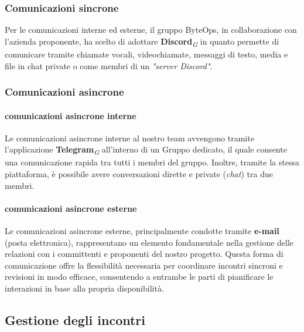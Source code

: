 \documentclass{article}
\begin{document}
    \subsubsection{Comunicazioni sincrone}
    Per le comunicazioni interne ed esterne, il gruppo ByteOps, in collaborazione con l'azienda proponente, ha scelto di adottare \textbf{Discord}\textsubscript{\textit{G}} in quanto permette di comunicare tramite chiamate vocali, videochiamate, messaggi di testo, media e file in chat private o come membri di un \textit{"server Discord"}.
    \subsubsection{Comunicazioni asincrone}
        \paragraph{comunicazioni asincrone interne}
        Le comunicazioni asincrone interne al nostro team avvengono tramite l'applicazione \textbf{Telegram}\textsubscript{\textit{G}} all'interno di un Gruppo dedicato, il quale consente una comunicazione rapida tra tutti i membri del gruppo. Inoltre, tramite la stessa piattaforma, è possibile avere conversazioni dirette e private (\textit{chat}) tra due membri.
        \paragraph{comunicazioni asincrone esterne}
        Le comunicazioni asincrone esterne, principalmente condotte tramite \textbf{e-mail} (posta elettronica), rappresentano un elemento fondamentale nella gestione delle relazioni con i committenti e proponenti del nostro progetto. Questa forma di comunicazione offre la flessibilità necessaria per coordinare incontri sincroni e revisioni in modo efficace, consentendo a entrambe le parti di pianificare le interazioni in base alla propria disponibilità. 
    
    \subsection{Gestione degli incontri}
\end{document}
